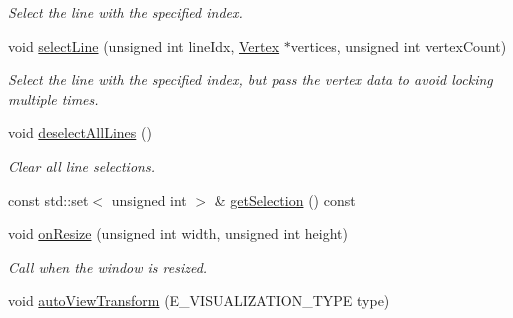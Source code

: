 \begin{DoxyCompactItemize}
\begin{DoxyCompactList}\small\item\em Select the line with the specified index. \end{DoxyCompactList}\item 
void \hyperlink{class_lots_of_lines_1_1_rendering_system_a00157ef4548d93715c583ff86a316d5e}{select\+Line} (unsigned int line\+Idx, \hyperlink{struct_lots_of_lines_1_1_vertex}{Vertex} $\ast$vertices, unsigned int vertex\+Count)\hypertarget{class_lots_of_lines_1_1_rendering_system_a00157ef4548d93715c583ff86a316d5e}{}\label{class_lots_of_lines_1_1_rendering_system_a00157ef4548d93715c583ff86a316d5e}

\begin{DoxyCompactList}\small\item\em Select the line with the specified index, but pass the vertex data to avoid locking multiple times. \end{DoxyCompactList}\item 
void \hyperlink{class_lots_of_lines_1_1_rendering_system_ab2b7262da1f29842106ddb68d6e29720}{deselect\+All\+Lines} ()\hypertarget{class_lots_of_lines_1_1_rendering_system_ab2b7262da1f29842106ddb68d6e29720}{}\label{class_lots_of_lines_1_1_rendering_system_ab2b7262da1f29842106ddb68d6e29720}

\begin{DoxyCompactList}\small\item\em Clear all line selections. \end{DoxyCompactList}\item 
const std\+::set$<$ unsigned int $>$ \& \hyperlink{class_lots_of_lines_1_1_rendering_system_a4a147df3651fac58149687c444ad92b7}{get\+Selection} () const 
\item 
void \hyperlink{class_lots_of_lines_1_1_rendering_system_a24608a65b729f0db1f77d9076450cd27}{on\+Resize} (unsigned int width, unsigned int height)\hypertarget{class_lots_of_lines_1_1_rendering_system_a24608a65b729f0db1f77d9076450cd27}{}\label{class_lots_of_lines_1_1_rendering_system_a24608a65b729f0db1f77d9076450cd27}

\begin{DoxyCompactList}\small\item\em Call when the window is resized. \end{DoxyCompactList}\item 
void \hyperlink{class_lots_of_lines_1_1_rendering_system_af31099644a0b6dd010b4d0340a6866b7}{auto\+View\+Transform} (E\+\_\+\+V\+I\+S\+U\+A\+L\+I\+Z\+A\+T\+I\+O\+N\+\_\+\+T\+Y\+PE type)\hypertarget{class_lots_of_lines_1_1_rendering_system_af31099644a0b6dd010b4d0340a6866b7}{}\label{class_lots_of_lines_1_1_rendering_system_af31099644a0b6dd010b4d0340a6866b7}


\end{DoxyCompactItemize}

